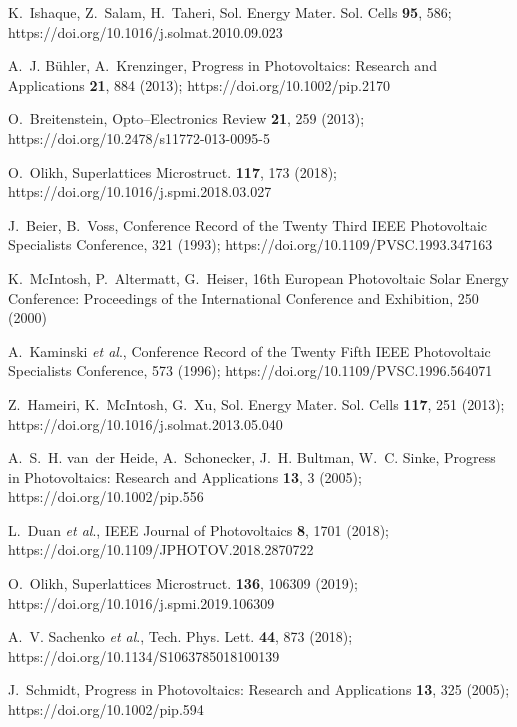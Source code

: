 \documentclass[12pt]{article}
\begin{document}
\begin{thebibliography}{99}

K.~Ishaque, Z.~Salam, H.~Taheri, Sol. Energy Mater. Sol. Cells \textbf{95}, 586;
  https://doi.org/10.1016/j.solmat.2010.09.023

A.~J. B\"{u}hler, A.~Krenzinger, Progress in Photovoltaics:
  Research and Applications \textbf{21}, 884 (2013);
 https://doi.org/10.1002/pip.2170

O.~Breitenstein, Opto--Electronics Review \textbf{21}, 259 (2013);
https://doi.org/10.2478/s11772-013-0095-5

O.~Olikh, Superlattices Microstruct. \textbf{117}, 173 (2018);
https://doi.org/10.1016/j.spmi.2018.03.027

J.~{Beier}, B.~{Voss}, Conference Record of the Twenty Third IEEE Photovoltaic
  Specialists Conference, 321 (1993);
https://doi.org/10.1109/PVSC.1993.347163

K.~McIntosh, P.~Altermatt, G.~Heiser, 16th European Photovoltaic
  Solar Energy Conference: Proceedings of the International Conference and
  Exhibition, 250 (2000)

A.~{Kaminski} \emph{et al}., Conference Record of the Twenty Fifth IEEE Photovoltaic Specialists Conference, 573 (1996);
https://doi.org/10.1109/PVSC.1996.564071

Z.~Hameiri, K.~McIntosh, G.~Xu, Sol. Energy Mater.
  Sol. Cells \textbf{117}, 251 (2013);
https://doi.org/10.1016/j.solmat.2013.05.040

A.~S.~H. van~der Heide, A.~Schonecker, J.~H. Bultman, W.~C. Sinke, Progress
  in Photovoltaics: Research and Applications \textbf{13}, 3 (2005);
https://doi.org/10.1002/pip.556

L.~{Duan}  \emph{et al}., IEEE Journal of
  Photovoltaics \textbf{8}, 1701 (2018);
https://doi.org/10.1109/JPHOTOV.2018.2870722

O.~Olikh, Superlattices Microstruct. \textbf{136}, 106309 (2019);
https://doi.org/10.1016/j.spmi.2019.106309

A.~V. Sachenko \emph{et al}., Tech. Phys. Lett. \textbf{44}, 873  (2018);
https://doi.org/10.1134/S1063785018100139

J.~Schmidt, Progress in Photovoltaics: Research and
  Applications \textbf{13}, 325 (2005);
https://doi.org/10.1002/pip.594


\end{thebibliography}
\end{document}
